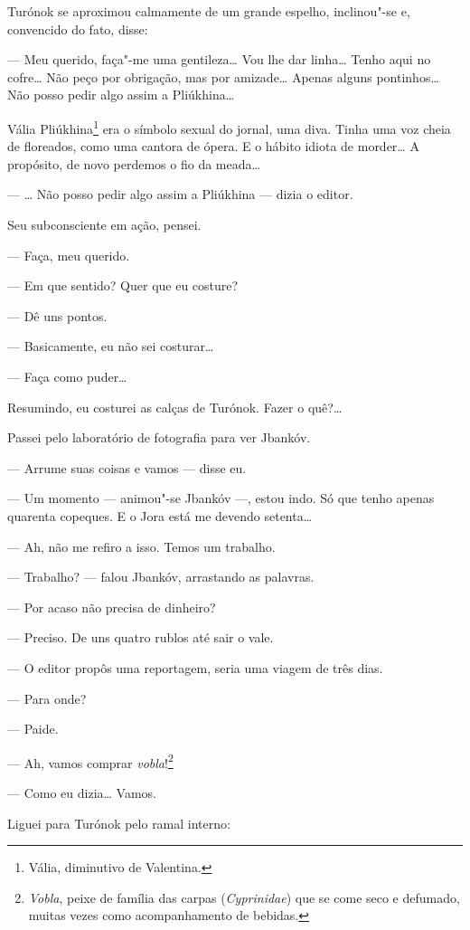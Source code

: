 Turónok se aproximou calmamente de um grande espelho, inclinou"-se e,
convencido do fato, disse:

--- Meu querido, faça"-me uma gentileza\ldots{} Vou lhe dar linha\ldots{}
Tenho aqui no cofre\ldots{} Não peço por obrigação, mas por amizade\ldots{} Apenas
alguns pontinhos\ldots{} Não posso pedir algo assim a Pliúkhina\ldots{}

Vália Pliúkhina\footnote{Vália, diminutivo de Valentina.} era o símbolo sexual do jornal, uma diva. Tinha uma voz
cheia de floreados, como uma cantora de ópera. E o hábito idiota de
morder\ldots{} A propósito, de novo perdemos o fio da meada\ldots{}

--- \ldots{} Não posso pedir algo assim a Pliúkhina --- dizia o
editor.

Seu subconsciente em ação, pensei.

--- Faça, meu querido.

--- Em que sentido? Quer que eu costure?

--- Dê uns pontos.

--- Basicamente, eu não sei costurar\ldots{}

--- Faça como puder\ldots{}

Resumindo, eu costurei as calças de Turónok. Fazer o quê?\ldots{}

Passei pelo laboratório de fotografia para ver Jbankóv.

--- Arrume suas coisas e vamos --- disse eu.

--- Um momento --- animou"-se Jbankóv ---, estou
indo. Só que tenho apenas quarenta copeques. E o Jora está me devendo
setenta\ldots{}

--- Ah, não me refiro a isso. Temos um trabalho.

--- Trabalho? --- falou Jbankóv, arrastando as palavras.

--- Por acaso não precisa de dinheiro?

--- Preciso. De uns quatro rublos até sair o vale.

--- O editor propôs uma reportagem, seria uma viagem de três
dias.

--- Para onde?

--- Paide.

--- Ah, vamos comprar \emph{vobla}!\footnote{\emph{Vobla}, peixe
  de família das carpas (\emph{Cyprinidae}) que se come seco e defumado,
  muitas vezes como acompanhamento de bebidas.}

--- Como eu dizia\ldots{} Vamos.

Liguei para Turónok pelo ramal interno:

